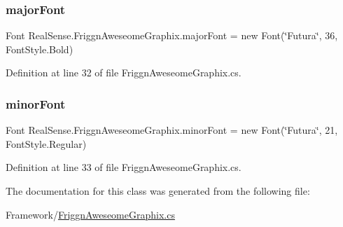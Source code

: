 \subsubsection{\texorpdfstring{major\+Font}{majorFont}}
{\footnotesize\ttfamily Font Real\+Sense.\+Friggn\+Aweseome\+Graphix.\+major\+Font = new Font(\char`\"{}Futura\char`\"{}, 36, Font\+Style.\+Bold)\hspace{0.3cm}{\ttfamily [static]}}



Definition at line 32 of file Friggn\+Aweseome\+Graphix.\+cs.

\mbox{\label{class_real_sense_1_1_friggn_aweseome_graphix_a9d2afacf158345fcecf1b25b895806a2}} 
\subsubsection{\texorpdfstring{minor\+Font}{minorFont}}
{\footnotesize\ttfamily Font Real\+Sense.\+Friggn\+Aweseome\+Graphix.\+minor\+Font = new Font(\char`\"{}Futura\char`\"{}, 21, Font\+Style.\+Regular)\hspace{0.3cm}{\ttfamily [static]}}



Definition at line 33 of file Friggn\+Aweseome\+Graphix.\+cs.



The documentation for this class was generated from the following file\+:\begin{DoxyCompactItemize}
\item 
Framework/\hyperlink{_friggn_aweseome_graphix_8cs}{Friggn\+Aweseome\+Graphix.\+cs}\end{DoxyCompactItemize}
